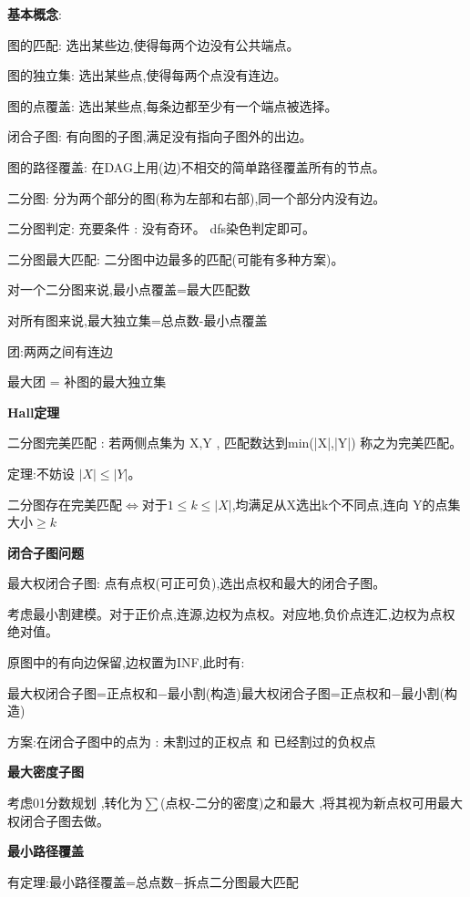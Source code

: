 \documentclass[a4paper]{ctexart}
\begin{document}
\textbf{基本概念}:

图的匹配: 选出某些边,使得每两个边没有公共端点。

图的独立集: 选出某些点,使得每两个点没有连边。

图的点覆盖: 选出某些点,每条边都至少有一个端点被选择。

闭合子图: 有向图的子图,满足没有指向子图外的出边。

图的路径覆盖: 在DAG上用(边)不相交的简单路径覆盖所有的节点。

二分图: 分为两个部分的图(称为左部和右部),同一个部分内没有边。

二分图判定: 充要条件 : 没有奇环。 dfs染色判定即可。

二分图最大匹配: 二分图中边最多的匹配(可能有多种方案)。

对一个二分图来说,最小点覆盖=最大匹配数

对所有图来说,最大独立集=总点数-最小点覆盖

团:两两之间有连边

最大团 = 补图的最大独立集




\textbf{Hall定理}



二分图完美匹配 : 若两侧点集为 X,Y , 匹配数达到min(|X|,|Y|) 称之为完美匹配。

定理:不妨设 $|X|\le |Y|$。

二分图存在完美匹配$\iff$对于$1\le k\le |X|$,均满足从X选出k个不同点,连向 Y的点集大小$\ge k$



\textbf{闭合子图问题}

最大权闭合子图: 点有点权(可正可负),选出点权和最大的闭合子图。

考虑最小割建模。对于正价点,连源,边权为点权。对应地,负价点连汇,边权为点权绝对值。

原图中的有向边保留,边权置为INF,此时有:

最大权闭合子图=正点权和−最小割(构造)最大权闭合子图=正点权和−最小割(构造)

方案:在闭合子图中的点为 : 未割过的正权点 \quad 和 \quad 已经割过的负权点



\textbf{最大密度子图}

考虑01分数规划 ,转化为$\sum$(点权-二分的密度)之和最大 ,将其视为新点权可用最大权闭合子图去做。



\textbf{最小路径覆盖}

有定理:最小路径覆盖=总点数−拆点二分图最大匹配
\end{document}
